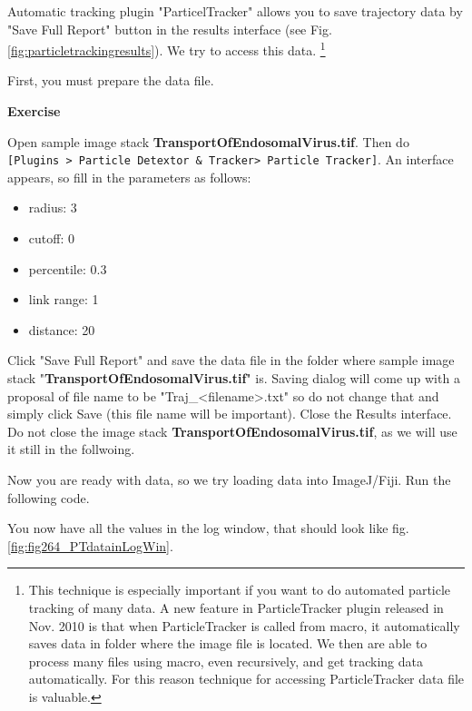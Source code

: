 \documentclass[11pt,a4paper,oneside]{report}
\newenvironment{indentexercise}[1]%
{{\setlength{\leftmargin}{2em}}%
\textbf{Exercise \thesubsection-#1}%
\begin{list}{}%
	\item%
}
{\end{list}}
\newcommand{\ijmenu}[1]{\texttt{\small#1}}
\begin{document}
Automatic tracking plugin "ParticelTracker" allows you to save trajectory data by "Save Full Report" button in the results interface (see Fig. \ref{fig:particletrackingresults}). We try to access this data. \footnote{ This technique is especially important if you want to do automated particle tracking of many data. A new feature in ParticleTracker plugin released in Nov. 2010 is that when ParticleTracker is called from macro, it automatically saves data in folder where the image file is located. We then are able to process many files using macro, even recursively, and get tracking data automatically. For this reason technique for accessing ParticleTracker data file is valuable.}

First, you must prepare the data file. 

\begin{indentexercise}{1}
\item Open sample image stack \textbf{TransportOfEndosomalVirus.tif}. Then do \ijmenu{[Plugins > Particle Detextor \& Tracker> Particle Tracker]}. An interface appears, so fill in the parameters as follows:
\begin{itemize}
\item radius: 3
\item cutoff: 0
\item percentile: 0.3
\item link range: 1
\item distance: 20
\end{itemize}
\item Click "Save Full Report" and save the data file in the folder where sample image stack "\textbf{TransportOfEndosomalVirus.tif}" is. Saving dialog will come up with a proposal of file name to be "Traj\_<filename>.txt" so do not change that and simply click Save (this file name will be important). Close the Results interface. Do not close the image stack \textbf{TransportOfEndosomalVirus.tif}, as we will use it still in the follwoing.
\end{indentexercise}

Now you are ready with data, so we try loading data into ImageJ/Fiji. Run the following code. 



You now have all the values in the log window, that should look like fig. \ref{fig:fig264_PTdatainLogWin}. 
\end{document}
